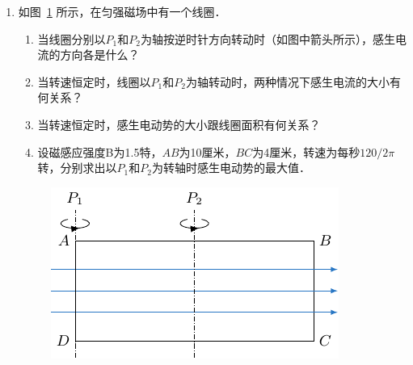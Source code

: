 \begin{enumerate}
 \item 如图~\ref{fig_C_2-37} 所示，在匀强磁场中有一个线圈．
    \begin{enumerate}
        \item 当线圈分别以$P_1$和$P_2$为轴按逆时针方向转动时（如图中箭头所示），感生电流的方向各是什么？
        \item 当转速恒定时，线圈以$P_1$和$P_2$为轴转动时，两种情况下感生电流的大小有何关系？
        \item 当转速恒定时，感生电动势的大小跟线圈面积有何关系？
        \item 设磁感应强度B为1.5特，$AB$为10厘米，$BC$为4厘米，转速为每秒$120/2\pi$转，分别求出以$P_1$和$P_2$为转轴时感生电动势的最大值．
    \end{enumerate}
    \begin{figure}[htbp]
    	\centering
    	\includegraphics{fig/C/2-37.pdf}
    	\caption{}\label{fig_C_2-37}
    \end{figure}
    

\end{enumerate}
